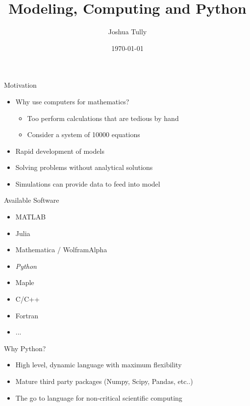 \documentclass{beamer}
\title{Modeling, Computing and Python}
\date{\today}
\author{Joshua Tully}
\begin{document}
  \maketitle
  \begin{frame}{Motivation}
    \begin{itemize}
    \item Why use computers for mathematics?
	    \begin{itemize}
	    \item {Too perform calculations that are tedious by hand}
	    \item Consider a system of 10000 equations
	    \end{itemize}
	\item Rapid development of models
	\item Solving problems without analytical solutions
	\item Simulations can provide data to feed into model
    \end{itemize}
  \end{frame}
  \begin{frame}{Available Software}
  \begin{itemize}
	  \item MATLAB
	  \item Julia
	  \item Mathematica / WolframAlpha
	  \item{{\color{green}\em{Python}}}
	  \item Maple
	  \item C/C++
	  \item Fortran
	  \item ...
  \end{itemize}
  \end{frame}
  \begin{frame}{Why Python?}
  \begin{itemize}
	  \item High level, dynamic language with maximum flexibility
	  \item Mature third party packages (Numpy, Scipy, Pandas, etc..)
	  \item The go to language for non-critical scientific computing
  \end{itemize}
  \end{frame}
  
\end{document}
